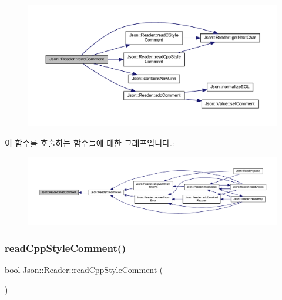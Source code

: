 \begin{figure}[H]
\begin{center}
\leavevmode
\includegraphics[width=350pt]{class_json_1_1_reader_ad2690e860a1b3332c5401fb0850ba065_cgraph}
\end{center}
\end{figure}
이 함수를 호출하는 함수들에 대한 그래프입니다.\+:\nopagebreak
\begin{figure}[H]
\begin{center}
\leavevmode
\includegraphics[width=350pt]{class_json_1_1_reader_ad2690e860a1b3332c5401fb0850ba065_icgraph}
\end{center}
\end{figure}
\mbox{\label{class_json_1_1_reader_a6716ef6290b0f469efaf8d379c357967}} 
\subsubsection{\texorpdfstring{read\+Cpp\+Style\+Comment()}{readCppStyleComment()}}
{\footnotesize\ttfamily bool Json\+::\+Reader\+::read\+Cpp\+Style\+Comment (\begin{DoxyParamCaption}{ }\end{DoxyParamCaption})\hspace{0.3cm}{\ttfamily [private]}}



